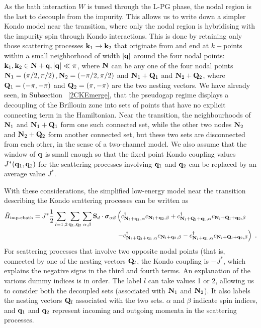 As the bath interaction \(W\) is tuned through the L-PG phase, the nodal region is the last to decouple from the impurity. This allows us to write down a simpler Kondo model near the transition, where only the nodal region is hybridising with the impurity spin through Kondo interactions. This is done by retaining only those scattering processes \({\bf k}_1 \to {\bf k}_2\) that originate from and end at \(k-\)points within a small neighborhood of width \(|{\bf q}|\) around the four nodal points: \({\bf k}_1, {\bf k}_2 \in {\bf N} + {\bf q}, |{\bf q}| \ll \pi\), where \({\bf N}\) can be any one of the four nodal points \({\bf N}_{1} = \left(\pi/2, \pi/2\right), {\bf N}_{2} = \left(-\pi/2, \pi/2\right)\) and \({\bf N}_1 + {\bf Q}_1\) and \({\bf N}_{2} + {\bf Q}_2\), where \({\bf Q}_1 = \left(-\pi,-\pi \right)\) and \({\bf Q}_2 = \left( \pi, -\pi \right) \) are the two nesting vectors. We have already seen, in Subsection ~\ref{2CKEmerge}, that the pseudogap regime displays a decoupling of the Brillouin zone into sets of points that have no explicit connecting term in the Hamiltonian. Near the transition, the neighbourhoods of \({\bf N}_{1}\) and \({\bf N}_{1} + {\bf Q}_1\) form one such connected set, while the other two nodes \({\bf N}_{2}\) and \({\bf N}_{2} + {\bf Q}_2\) form another connected set, but these two sets are disconnected from each other, in the sense of a two-channel model. We also assume that the window of \({\bf q}\) is small enough so that the fixed point Kondo coupling values \(J^*({\bf q}_1, {\bf q}_2)\) for the scattering processes involving \({\bf q}_1\) and \({\bf q}_2\) can be replaced by an average value \(J^*\).

With these considerations, the simplified low-energy model near the transition describing the Kondo scattering processes can be written as
\begin{equation}\begin{aligned}
	\tilde H_\text{imp-cbath} = J^*\frac{1}{2}\sum_{l=1,2}\sum_{{\bf q}_1, {\bf q}_2}\sum_{\alpha,\beta}{\bf S}_d\cdot{\boldsymbol \sigma}_{\alpha\beta}&\left(c^\dagger_{{\bf N}_l + {\bf q}_1,\alpha}c_{{\bf N}_l + {\bf q}_2,\beta} + c^\dagger_{{\bf N}_l + {\bf Q}_l + {\bf q}_1,\alpha}c_{{\bf N}_l + {\bf Q}_l + {\bf q}_2,\beta} \right. \\
&\left. - c^\dagger_{{\bf N}_l + {\bf Q}_l + {\bf q}_1,\alpha}c_{{\bf N}_l + {\bf q}_2,\beta} - c^\dagger_{{\bf N}_l + {\bf q}_1,\alpha}c_{{\bf N}_l + {\bf Q}_l + {\bf q}_2,\beta}\right)~.
\end{aligned}\end{equation}
For scattering processes that involve two opposite nodal points (that is, connected by one of the nesting vectors \({\bf Q}_l\), the Kondo coupling is \(-J^*\), which explains the negative signs in the third and fourth terms. An explanation of the various dummy indices is in order. The label \(l\) can take values 1 or 2, allowing us to consider both the decoupled sets (associated with \({\bf N}_1\) and \({\bf N}_2\)). It also labels the nesting vectors \({\bf Q}_l\) associated with the two sets. \(\alpha\) and \(\beta\) indicate spin indices, and \({\bf q}_1\) and \({\bf q}_2\) represent incoming and outgoing momenta in the scattering processes.

